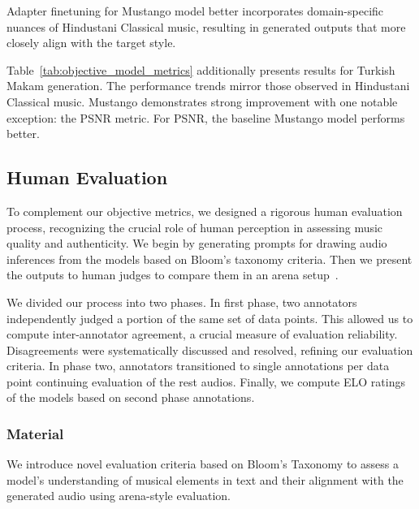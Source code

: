 Adapter finetuning for Mustango model better incorporates domain-specific nuances of Hindustani Classical music, resulting in generated outputs that more closely align with the target style.


Table~\ref{tab:objective_model_metrics} additionally presents results for Turkish Makam generation. The performance trends mirror those observed in Hindustani Classical music. Mustango demonstrates strong improvement with one notable exception: the PSNR metric. For PSNR, the baseline Mustango model performs better.

\subsection{Human Evaluation}
To complement our objective metrics, we designed a rigorous human evaluation process, recognizing the crucial role of human perception in assessing music quality and authenticity. We begin by generating prompts for drawing audio inferences from the models based on Bloom's taxonomy criteria. Then we present the outputs to human judges to compare them in an arena setup~\cite{chiang2024chatbot, tts-arena}.  

We divided our process into two phases. In first phase, two annotators independently judged a portion of the same set of data points. This allowed us to compute inter-annotator agreement, a crucial measure of evaluation reliability. Disagreements were systematically discussed and resolved, refining our evaluation criteria. In phase two, annotators transitioned to single annotations per data point continuing evaluation of the rest audios. Finally, we compute ELO ratings of the models based on second phase annotations. 

\subsubsection{Material}

We introduce novel evaluation criteria based on Bloom's Taxonomy to assess a model's understanding of musical elements in text and their alignment with the generated audio using arena-style evaluation.

